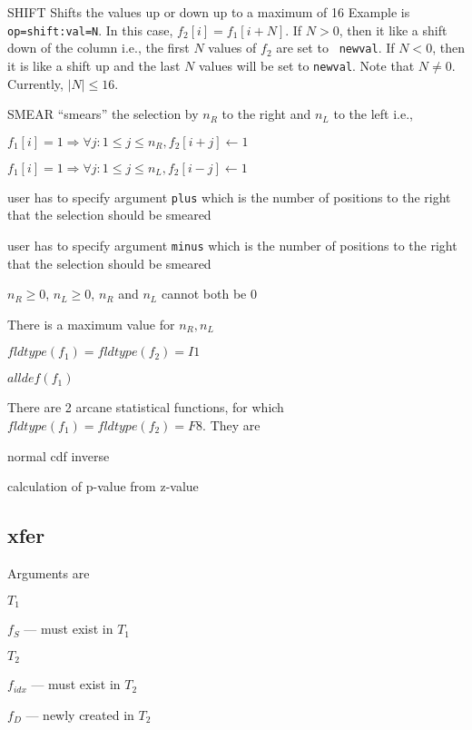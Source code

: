 \documentclass{report}
\begin{document}
\item [SHIFT] Shifts the values up or down up to a maximum of 16
Example is \verb+op=shift:val=N+. In this case,
\(f_2[i] = f_1[i+N]\). If \(N > 0 \), then it like a shift down
of the column i.e., the first \(N\) values of \(f_2\) are set to {\tt
  newval}. 
  If
\(N < 0\), then it is like a shift up and the last \(N\) values will be
set to {\tt newval}. 
Note that \(N \neq 0\). Currently, \(|N| \leq 16\).

\item [SMEAR] ``smears'' the selection by \(n_R\) to the right and
\(n_L\) to the left i.e., 
\bi
\item 
\(f_1[i] = 1 \Rightarrow \forall j: 1 \leq j \leq n_R, f_2[i+j] \leftarrow 1\)
  \item 
\(f_1[i] = 1 \Rightarrow \forall j: 1 \leq j \leq n_L, f_2[i-j] \leftarrow 1\) 
\ei
\be
\item user has to specify argument {\tt plus} which is the number of
positions to the right that the selection should be smeared
\item user has to specify argument {\tt minus} which is the number of
positions to the right that the selection should be smeared
\item \(n_R \geq 0\), \(n_L \geq 0\), \(n_R\) and \(n_L\) cannot both be
0
\item There is a maximum value for \(n_R, n_L\)
\item \(fldtype(f_1) = fldtype(f_2) = I1\)
\item \(alldef(f_1)\)
\ee
\ed

There are 2 arcane statistical functions, for which \(fldtype(f_1) =
fldtype(f_2) = F8\). They are
\be
\item normal cdf inverse
\item calculation of p-value from z-value
\ee

\subsection{xfer}
\label{xfer}

Arguments are 
\be
\item \(T_1\)
\item \(f_S\) --- must exist in \(T_1\)
\item \(T_2\)
\item \(f_{idx}\) --- must exist in \(T_2\)
\item \(f_D\) --- newly created in \(T_2\)
\ee
\end{document}
